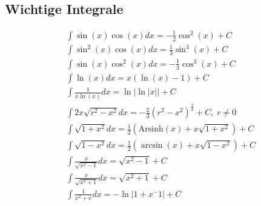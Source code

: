 \subsection{Wichtige Integrale}
    \begin{align*}
        &\int \sin(x) \cos(x) dx = - \frac{1}{2} \cos^2(x) + C\\
        &\int \sin^2(x) \cos(x) dx = \frac{1}{3} \sin^3(x) + C\\
        &\int \sin(x) \cos^2(x) dx = - \frac{1}{3} \cos^3(x) + C\\
        &\int \ln(x) dx = x(\ln(x) -1) + C\\
        &\int \frac{1}{x \ln(x)} dx = \ln|\ln|x|| + C\\
        &\int 2x \sqrt{r^2 - x^2} dx = -\frac{2}{3} (r^2-x^2)^\frac{3}{2} + C, \; r \neq 0\\
        &\int \sqrt{1+x^2} dx = \frac{1}{2} \left(\textrm{Arsinh}(x) + x \sqrt{1+x^2}\right) + C\\
        &\int \sqrt{1-x^2} dx = \frac{1}{2} \left(\arcsin(x) + x \sqrt{1-x^2}\right) + C\\
        &\int \frac{x}{\sqrt{x^2-1}} dx = \sqrt{x^2-1} + C\\
        &\int \frac{x}{\sqrt{x^2+1}} dx = \sqrt{x^2+1} + C\\
        &\int \frac{1}{x^2+x} dx = -\ln|1+x^-1| + C\\
    \end{align*}
    \vspace*{-0.5em}